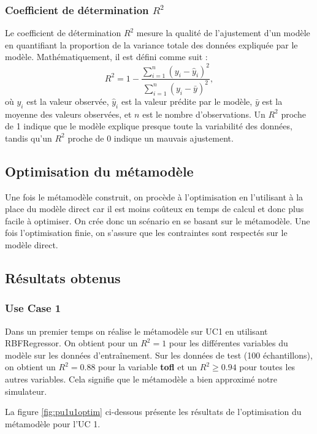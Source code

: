 \documentclass[a4paper, 11pt]{article}
\begin{document}
\subsubsection{Coefficient de détermination $R^2$}
Le coefficient de détermination \( R^2 \) mesure la qualité de l’ajustement d’un modèle en quantifiant la proportion de la variance totale des données expliquée par le modèle. Mathématiquement, il est défini comme suit :
\[
R^2 = 1 - \frac{\sum_{i=1}^n (y_i - \hat{y}_i)^2}{\sum_{i=1}^n (y_i - \bar{y})^2},
\]
où \( y_i \) est la valeur observée, \( \hat{y}_i \) est la valeur prédite par le modèle, \( \bar{y} \) est la moyenne des valeurs observées, et \( n \) est le nombre d’observations. Un \( R^2 \) proche de 1 indique que le modèle explique presque toute la variabilité des données, tandis qu’un \( R^2 \) proche de 0 indique un mauvais ajustement.

\subsection{Optimisation du métamodèle}

Une fois le métamodèle construit, on procède à l'optimisation en l'utilisant à la place du modèle direct car il est moins coûteux en temps de calcul et donc plus facile à optimiser.
On crée donc un scénario en se basant sur le métamodèle.
Une fois l'optimisation finie, on s'assure que les contraintes sont respectés sur le modèle direct.

\subsection{Résultats obtenus}

\subsubsection{Use Case 1}

Dans un premier temps on réalise le métamodèle sur UC1 en utilisant RBFRegressor. On obtient pour un $R^2 = 1$ pour les différentes variables du modèle sur les données d'entraînement. Sur les données de test (100 échantillons), on obtient un $R^2 = 0.88$ pour la variable \textbf{tofl} et un $R^2 \geq 0.94 $ pour toutes les autres variables. Cela signifie que le métamodèle a bien approximé notre simulateur. \newline 

La figure \ref{fig:pu1u1optim} ci-dessous présente les résultats de l'optimisation du métamodèle pour l'UC 1.
\end{document}
